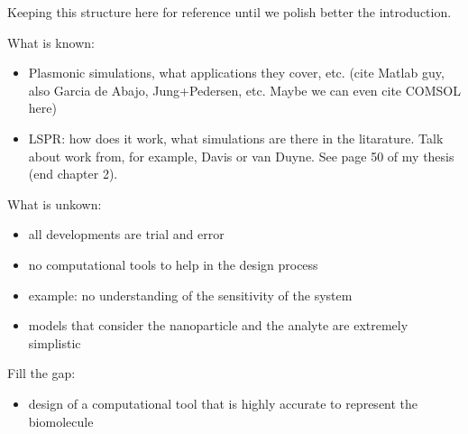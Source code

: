 {\color{red}  Keeping this structure here for reference until we polish better
the introduction.

What is known:
\begin{itemize}
\item Plasmonic simulations, what applications they cover, etc. (cite Matlab guy, also Garcia de Abajo, Jung+Pedersen, etc. Maybe we can even cite COMSOL here)
\item LSPR: how does it work, what simulations are there in the litarature. Talk about work from, for example, Davis or van Duyne. See page 50 of my thesis (end chapter 2).
\end{itemize}

What is unkown:
\begin{itemize}
\item all developments are trial and error
\item no computational tools to help in the design process
\item example: no understanding of the sensitivity of the system
\item models that consider the nanoparticle and the analyte are extremely simplistic
\end{itemize}

Fill the gap:
\begin{itemize}
\item design of a computational tool that is highly accurate to represent the biomolecule
\end{itemize}
}

